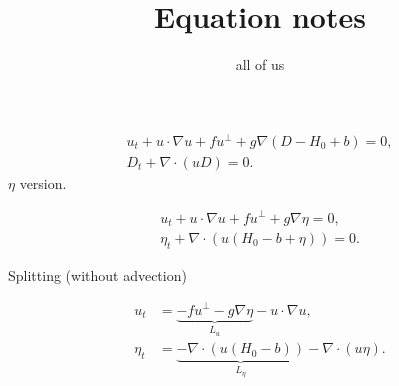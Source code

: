 \documentclass{article}
\begin{document}
\title{Equation notes}
\author{all of us}
\maketitle

\begin{align}
  u_t + u\cdot\nabla u + fu^{\perp} + g\nabla (D-H_0+b) = 0, \\
  D_t + \nabla\cdot (uD) = 0.
\end{align}
$\eta$ version.

\begin{align}
  u_t + u\cdot\nabla u + fu^{\perp} + g\nabla \eta = 0, \\
  \eta_t + \nabla\cdot (u(H_0-b+\eta)) = 0.
\end{align}

Splitting (without advection)

\begin{align}
  u_t &= \underbrace{- fu^{\perp} - g\nabla \eta}_{L_u} -u\cdot\nabla u, \\
  \eta_t &=\underbrace{- \nabla\cdot (u(H_0-b))}_{L_\eta} -\nabla\cdot (u\eta).
\end{align}
\end{document}
